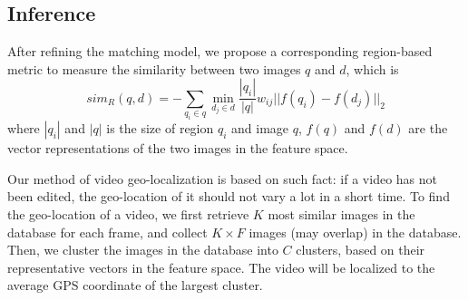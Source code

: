 \subsection{Inference}
After refining the matching model, we propose a corresponding region-based metric to measure the similarity between two images $q$ and $d$, which is 
\begin{equation}
sim_R(q,d) = -\sum_{q_i \in q} \min_{d_j\in d} \frac{|q_i|}{|q|} w_{ij}||f(q_i)-f(d_j)||_2
\label{eq:simR}
\end{equation}
where $|q_i|$ and $|q|$ is the size of region $q_i$ and image $q$, $f(q)$ and $f(d)$ are the vector representations of the two images in the feature space. 

Our method of video geo-localization is based on such fact: if a video has not been edited, the geo-location of it should not vary a lot in a short time. 
To find the geo-location of a video, we first retrieve $K$ most similar images in the database for each frame, and collect $K\times F$ images (may overlap) in the database. 
Then, we cluster the images in the database into $C$ clusters, based on their representative vectors in the feature space. 
The video will be localized to the average GPS coordinate of the largest cluster.
